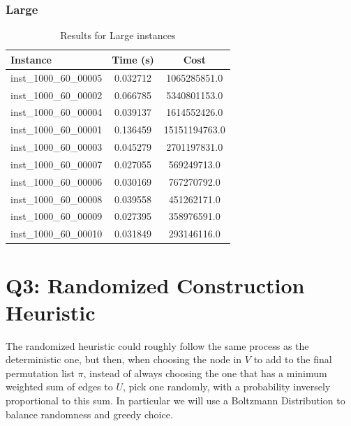 \documentclass{article}
\begin{document}
\subsubsection*{Large}
\begin{table}[H]
\centering
\begin{tabular}{lcc}
\toprule
\textbf{Instance}         & \textbf{Time (s)} & \textbf{Cost} \\ 
\midrule
inst\_1000\_60\_00005 & 0.032712 & 1065285851.0  \\ 
inst\_1000\_60\_00002 & 0.066785 & 5340801153.0  \\ 
inst\_1000\_60\_00004 & 0.039137 & 1614552426.0  \\ 
inst\_1000\_60\_00001 & 0.136459 & 15151194763.0 \\ 
inst\_1000\_60\_00003 & 0.045279 & 2701197831.0  \\ 
inst\_1000\_60\_00007 & 0.027055 & 569249713.0   \\ 
inst\_1000\_60\_00006 & 0.030169 & 767270792.0   \\ 
inst\_1000\_60\_00008 & 0.039558 & 451262171.0   \\ 
inst\_1000\_60\_00009 & 0.027395 & 358976591.0   \\ 
inst\_1000\_60\_00010 & 0.031849 & 293146116.0   \\ 
\bottomrule
\end{tabular}
\caption{Results for Large instances}
\end{table}





\section*{Q3: Randomized Construction Heuristic}
The randomized heuristic could roughly follow the same process as the deterministic one, but then, when choosing the node in $V$ to add to the final permutation list $\pi$, instead of always choosing the one that has a minimum weighted sum of edges to $U$, pick one randomly, with a probability inversely proportional to this sum.
In particular we will use a Boltzmann Distribution to balance randomness and greedy choice. 
\end{document}
